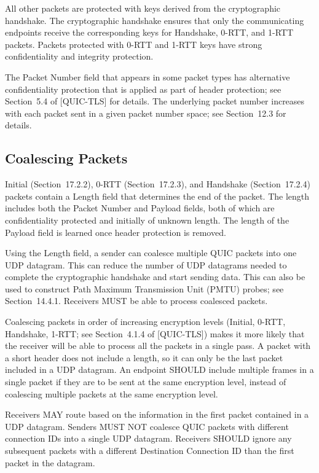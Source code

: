 \documentclass{article}
\begin{document}
All other packets are protected with keys derived from the cryptographic handshake.  The cryptographic handshake ensures that only the communicating endpoints receive the corresponding keys for Handshake, 0-RTT, and 1-RTT packets.  Packets protected with 0-RTT and 1-RTT keys have strong confidentiality and integrity protection.

The Packet Number field that appears in some packet types has alternative confidentiality protection that is applied as part of header protection; see Section~5.4 of [QUIC-TLS] for details.  The underlying packet number increases with each packet sent in a given packet number space; see Section~12.3 for details.

\subsection{Coalescing Packets}

Initial (Section~17.2.2), 0-RTT (Section~17.2.3), and Handshake (Section~17.2.4) packets contain a Length field that determines the end of the packet.  The length includes both the Packet Number and Payload fields, both of which are confidentiality protected and initially of unknown length.  The length of the Payload field is learned once header protection is removed.

Using the Length field, a sender can coalesce multiple QUIC packets into one UDP datagram.  This can reduce the number of UDP datagrams needed to complete the cryptographic handshake and start sending data.  This can also be used to construct Path Maximum Transmission Unit (PMTU) probes; see Section~14.4.1.  Receivers MUST be able to process coalesced packets.

Coalescing packets in order of increasing encryption levels (Initial, 0-RTT, Handshake, 1-RTT; see Section~4.1.4 of [QUIC-TLS]) makes it more likely that the receiver will be able to process all the packets in a single pass.  A packet with a short header does not include a length, so it can only be the last packet included in a UDP datagram. An endpoint SHOULD include multiple frames in a single packet if they are to be sent at the same encryption level, instead of coalescing multiple packets at the same encryption level.

Receivers MAY route based on the information in the first packet contained in a UDP datagram.  Senders MUST NOT coalesce QUIC packets with different connection IDs into a single UDP datagram.  Receivers SHOULD ignore any subsequent packets with a different Destination Connection ID than the first packet in the datagram.
\end{document}
